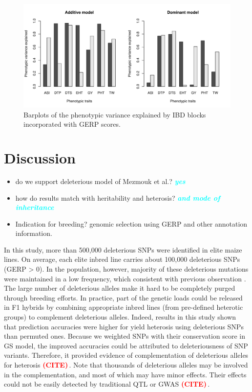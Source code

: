 \documentclass[9pt,twocolumn,twoside]{gsajnl}
\newcommand{\yang}[1]{\textcolor{cyan}{\emph{\bf  #1}} }
\newcommand{\citex}{\textcolor{red}{\bf (CITE)\,}}
\begin{document}
\begin{figure}[htbp]
\centering
\includegraphics[width=\linewidth]{Figure_h2.pdf}
\caption{Barplots of the phenotypic variance explained by IBD blocks incorporated with GERP scores.}
\label{fig:h2}
\end{figure}


\section*{Discussion}

\begin{itemize}
  \item do we support deleterious model of Mezmouk et al.? \yang{yes}
  \item how do results match with heritability and heterosis? \yang{and mode of inheritance}
  \item Indication for breeding? genomic selection using GERP and other annotation information. 
\end{itemize}


In this study, more than 500,000 deleterious SNPs were identified in elite maize lines. On average, each elite inbred line carries about 100,000 deleterious SNPs (GERP > 0). In the population, however, majority of these deleterious mutations were maintained in a low frequency, which consistent with previous observation \citep{rodgers2015recombination}. The large number of deleterious alleles make it hard to be completely purged through breeding efforts. In practice, part of the genetic loads could be released in F1 hybrids by combining appropriate inbred lines (from pre-defined heterotic groups) to complement deleterious alleles. Indeed, results in this study shown that prediction accuracies were higher for yield heterosis using deleterious SNPs than permuted ones. Because we weighted SNPs with their conservation score in GS model, the improved accuracies could be attributed to deleteriousness of SNP variants. Therefore, it provided evidence of complementation of deleterious alleles for heterosis \citex{}. Note that thousands of deleterious alleles may be involved in the complementation, and most of which may have minor effects. Their effects could not be easily detected by traditional QTL or GWAS \citex{}.
\end{document}

